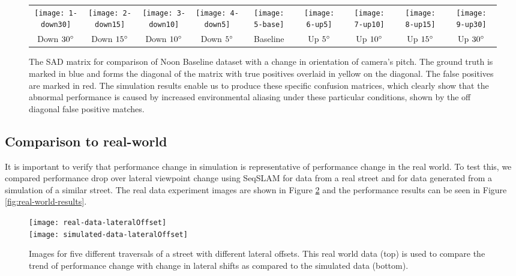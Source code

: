 \documentclass[letterpaper, 10 pt, conference]{ieeeconf}  %
\begin{document}
\begin{figure}[t]
\centering
\begin{tabular}[t]{ccccccccc}
    \texttt{[image: 1-down30]} &
    \texttt{[image: 2-down15]} &
    \texttt{[image: 3-down10]} &
    \texttt{[image: 4-down5]} &
    \texttt{[image: 5-base]} & 
    \texttt{[image: 6-up5]} &
    \texttt{[image: 7-up10]} &
    \texttt{[image: 8-up15]} &
    \texttt{[image: 9-up30]} \\
    Down $30\degree$ & Down $15\degree$ & Down $10\degree$ & Down $5\degree$ &
    Baseline &
    Up $5\degree$ & Up $10\degree$ & Up $15\degree$ & Up $30\degree$

\end{tabular}
    \caption{The SAD matrix for comparison of Noon Baseline dataset with a change in orientation of camera's pitch. The ground truth is marked in blue and forms the diagonal of the matrix with true positives overlaid in yellow on the diagonal. The false positives are marked in red. The simulation results enable us to produce these specific confusion matrices, which clearly show that the abnormal performance is caused by increased environmental aliasing under these particular conditions, shown by the off diagonal false positive matches.}
    \label{fig:seqSLAM-diffMat}
\end{figure}

\subsection{Comparison to real-world}

It is important to verify that performance change in simulation is representative of performance change in the real world. To test this, we compared performance drop over lateral viewpoint change using SeqSLAM for data from a real street and for data generated from a simulation of a similar street. The real data experiment images are shown in Figure \ref{fig:real-world-data} and the performance results can be seen in Figure \ref{fig:real-world-results}.

\begin{figure}[t]
\centering
    \texttt{[image: real-data-lateralOffset]} \\
    \vspace{0.1cm}
    \texttt{[image: simulated-data-lateralOffset]}
    \caption{Images for five different traversals of a street with different lateral offsets. This real world data (top) is used to compare the trend of performance change with change in lateral shifts as compared to the simulated data (bottom).}
    \label{fig:real-world-data}
\end{figure}
\end{document}
